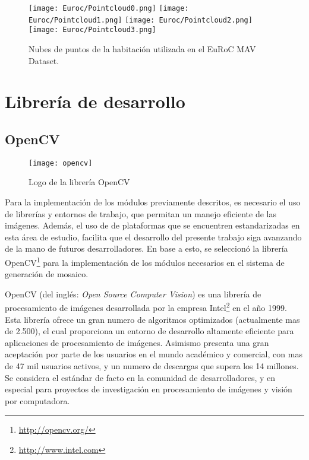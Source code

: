 {\begin{figure}[H]
	\centering
	\texttt{[image: Euroc/Pointcloud0.png]}
	\texttt{[image: Euroc/Pointcloud1.png]}
	\texttt{[image: Euroc/Pointcloud2.png]}
	\texttt{[image: Euroc/Pointcloud3.png]}
	\caption[Nubes de puntos de la habitación utilizada en el EuRoC MAV Dataset]{Nubes de puntos de la habitación utilizada en el EuRoC MAV Dataset.}
	\label{fig:pointcloudEuroc}
\end{figure}



\section{Librería de desarrollo}

\subsection{OpenCV}

\begin{wrapfigure}{R}{5cm}
	\begin{center}
		\vspace*{-0.2in}
		\texttt{[image: opencv]}
	\end{center}
	\caption{Logo de la librería OpenCV}
\end{wrapfigure}

Para la implementación de los módulos previamente descritos, es necesario el uso de librerías y entornos de trabajo, que permitan un manejo eficiente de las imágenes. Además, el uso de de plataformas que se encuentren estandarizadas en esta área de estudio, facilita que el desarrollo del presente trabajo siga avanzando de la mano de futuros desarrolladores. En base a esto, se seleccionó la librería OpenCV\footnote{\url{http://opencv.org/}} para la implementación de los módulos necesarios en el sistema de generación de mosaico.

OpenCV (del inglés: \textit{Open Source Computer Vision}) es una librería de procesamiento de imágenes desarrollada por la empresa Intel\footnote{\url{http://www.intel.com}} en el año 1999. Esta librería ofrece un gran numero de algoritmos optimizados (actualmente mas de 2.500), el cual proporciona un entorno de desarrollo altamente eficiente para aplicaciones de procesamiento de imágenes. Asimismo presenta una gran aceptación por parte de los usuarios en el mundo académico y comercial, con mas de 47 mil usuarios activos, y un numero de descargas que supera los 14 millones. Se considera el estándar de facto en la comunidad de desarrolladores, y en especial para proyectos de investigación en procesamiento de imágenes y visión por computadora. 

}
